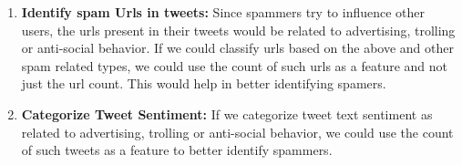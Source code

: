 \documentclass[paper=a4, fontsize=11pt]{scrartcl} %
\numberwithin{equation}{section} %
\numberwithin{figure}{section} %
\numberwithin{table}{section} %
\begin{document}
\begin{enumerate}
\begin{enumerate}
\item \textbf{Identify spam Urls in tweets:} Since spammers try to influence other users, the urls present in their tweets would be related to advertising, trolling or anti-social behavior. If we could classify urls based on the above and other spam related types, we could use the count of such urls as a feature and not just the url count. This would help in better identifying spamers.

\item \textbf{Categorize Tweet Sentiment:} If we categorize tweet text sentiment as related to advertising, trolling or anti-social behavior, we could use the count of such tweets as a feature to better identify spammers.

\end{enumerate}

\end{enumerate}
\end{document}
